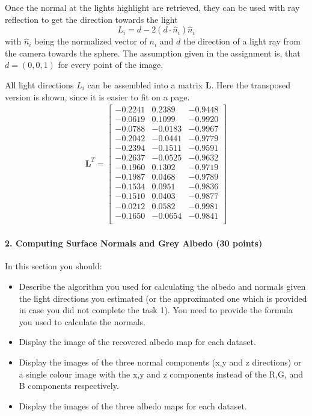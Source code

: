 \documentclass{paper}
\begin{document}
Once the normal at the lights highlight are retrieved, they can be used with ray reflection to get the direction towards the light
\begin{equation}
	L_i = d - 2(d\cdot \hat{n}_i)\hat{n}_i
\end{equation}
with $\hat{n}_i$ being the normalized vector of $n_i$ and $d$ the direction of a light ray from the camera towards the sphere.
The assumption given in the assignment is, 
that $d = (0,0,1)$ for every point of the image.

All light directions $L_i$ can be assembled into a matrix $\mathbf{L}$. Here the
transposed version is shown, since it is easier to fit on a page.
\begin{align*}
\mathbf{L}^T= 
\left[ 
\begin{array}{cccccccccccccc}
-0.2241 & 0.2389 & -0.9448 \\ -0.0619 & 0.1099 & -0.9920 \\ -0.0788 & -0.0183 & -0.9967 \\ -0.2042 & -0.0441 & -0.9779 \\ -0.2394 & -0.1511 & -0.9591 \\ -0.2637 & -0.0525 & -0.9632 \\ -0.1960 & 0.1302 & -0.9719 \\ -0.1987 & 0.0468 & -0.9789 \\ -0.1534 & 0.0951 & -0.9836 \\ -0.1510 & 0.0403 & -0.9877 \\ -0.0212 & 0.0582 & -0.9981 \\ -0.1650 & -0.0654 & -0.9841 \\  
\end{array} 
\right] 
\end{align*}


\paragraph{2. Computing Surface Normals and Grey Albedo (30 points)}

In this section you should:

\begin{itemize}
\item Describe the algorithm you used for calculating the albedo and normals given the light directions you estimated (or the approximated one which is provided in case you did not complete the task 1). You need to provide the formula you used to calculate the normals.

\item Display the image of the recovered albedo map for each dataset.
\item Display the images of the three normal components (x,y and z directions) or a single colour image with the x,y and z components instead of the R,G, and B components respectively.
\item Display the images of the three albedo maps for each dataset. 
\end{itemize}
\end{document}
